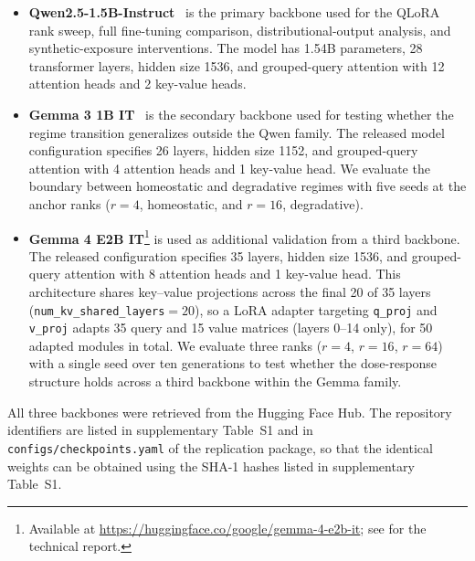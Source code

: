 \documentclass[a4paper,fleqn]{cas-dc}
\newif\ifshowchanges
\newcommand{\rev}[1]{\ifshowchanges{\color{blue}#1}\else{#1}\fi}
\begin{document}
\begin{itemize}
    \item \textbf{Qwen2.5-1.5B-Instruct}~\citep{qwen2024} is the primary
    backbone used for the QLoRA rank sweep, full fine-tuning comparison,
    distributional-output analysis, and synthetic-exposure interventions. The
    model has 1.54B parameters, 28 transformer layers, hidden size 1536, and
    grouped-query attention with 12 attention heads and 2 key-value heads.

    \item \textbf{Gemma 3 1B IT}~\citep{gemma2025} is the secondary backbone
    used for testing whether the regime transition generalizes outside the Qwen
    family. The released model configuration specifies 26 layers, hidden size
    1152, and grouped-query attention with 4 attention heads and 1 key-value
    head. We evaluate the boundary between homeostatic and degradative regimes
    with five seeds at the anchor ranks ($r=4$, homeostatic, and $r=16$, degradative).

    \item \textbf{Gemma 4 E2B IT}\footnote{Available at
    \url{https://huggingface.co/google/gemma-4-e2b-it};
    \rev{see \citet{gemma4_2026} for the technical report.}} is used as additional
    \rev{validation from a third backbone}. The released configuration specifies
    35 layers, hidden size 1536, and grouped-query attention with 8 attention
    heads and 1 key-value head. This architecture shares key--value projections
    across the final 20 of 35 layers (\texttt{num\_kv\_shared\_layers}$=20$),
    so a LoRA adapter targeting \texttt{q\_proj} and \texttt{v\_proj} adapts
    35 query and 15 value matrices (layers 0--14 only), for 50 adapted
    modules in total. We evaluate three ranks ($r=4$,
    $r=16$, $r=64$) with a single seed over ten generations to test whether
    the dose-response structure \rev{holds across a third backbone within the Gemma
    family}.
\end{itemize}


\rev{All three backbones were retrieved from the Hugging Face Hub.
The repository identifiers are listed
in supplementary Table~S1 and in \texttt{configs/checkpoints.yaml} of
the replication package, so that the identical weights can be
obtained using the SHA-1 hashes listed in supplementary Table~S1.}
\end{document}
